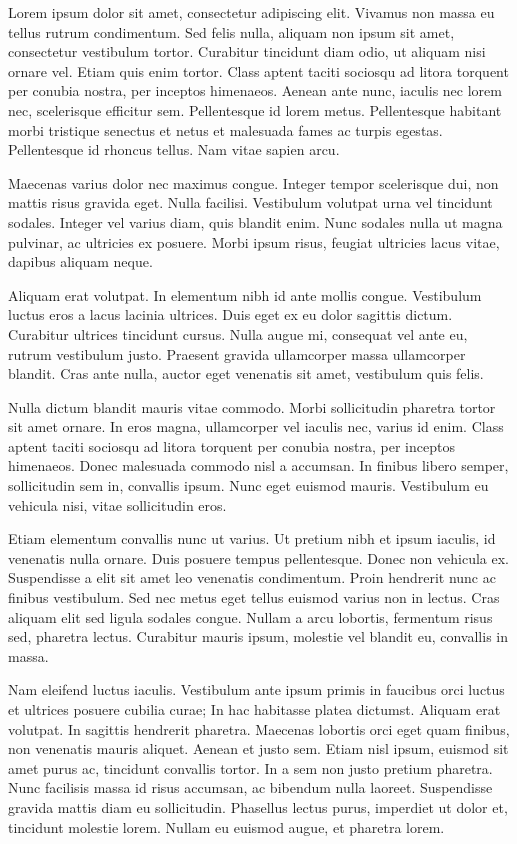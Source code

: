 \documentclass{article}
\begin{document}
Lorem ipsum dolor sit amet, consectetur adipiscing elit. Vivamus non massa eu tellus rutrum condimentum. Sed felis nulla, aliquam non ipsum sit amet, consectetur vestibulum tortor. Curabitur tincidunt diam odio, ut aliquam nisi ornare vel. Etiam quis enim tortor. Class aptent taciti sociosqu ad litora torquent per conubia nostra, per inceptos himenaeos. Aenean ante nunc, iaculis nec lorem nec, scelerisque efficitur sem. Pellentesque id lorem metus. Pellentesque habitant morbi tristique senectus et netus et malesuada fames ac turpis egestas. Pellentesque id rhoncus tellus. Nam vitae sapien arcu.

Maecenas varius dolor nec maximus congue. Integer tempor scelerisque dui, non mattis risus gravida eget. Nulla facilisi. Vestibulum volutpat urna vel tincidunt sodales. Integer vel varius diam, quis blandit enim. Nunc sodales nulla ut magna pulvinar, ac ultricies ex posuere. Morbi ipsum risus, feugiat ultricies lacus vitae, dapibus aliquam neque.

Aliquam erat volutpat. In elementum nibh id ante mollis congue. Vestibulum luctus eros a lacus lacinia ultrices. Duis eget ex eu dolor sagittis dictum. Curabitur ultrices tincidunt cursus. Nulla augue mi, consequat vel ante eu, rutrum vestibulum justo. Praesent gravida ullamcorper massa ullamcorper blandit. Cras ante nulla, auctor eget venenatis sit amet, vestibulum quis felis.

Nulla dictum blandit mauris vitae commodo. Morbi sollicitudin pharetra tortor sit amet ornare. In eros magna, ullamcorper vel iaculis nec, varius id enim. Class aptent taciti sociosqu ad litora torquent per conubia nostra, per inceptos himenaeos. Donec malesuada commodo nisl a accumsan. In finibus libero semper, sollicitudin sem in, convallis ipsum. Nunc eget euismod mauris. Vestibulum eu vehicula nisi, vitae sollicitudin eros.

Etiam elementum convallis nunc ut varius. Ut pretium nibh et ipsum iaculis, id venenatis nulla ornare. Duis posuere tempus pellentesque. Donec non vehicula ex. Suspendisse a elit sit amet leo venenatis condimentum. Proin hendrerit nunc ac finibus vestibulum. Sed nec metus eget tellus euismod varius non in lectus. Cras aliquam elit sed ligula sodales congue. Nullam a arcu lobortis, fermentum risus sed, pharetra lectus. Curabitur mauris ipsum, molestie vel blandit eu, convallis in massa.

Nam eleifend luctus iaculis. Vestibulum ante ipsum primis in faucibus orci luctus et ultrices posuere cubilia curae; In hac habitasse platea dictumst. Aliquam erat volutpat. In sagittis hendrerit pharetra. Maecenas lobortis orci eget quam finibus, non venenatis mauris aliquet. Aenean et justo sem. Etiam nisl ipsum, euismod sit amet purus ac, tincidunt convallis tortor. In a sem non justo pretium pharetra. Nunc facilisis massa id risus accumsan, ac bibendum nulla laoreet. Suspendisse gravida mattis diam eu sollicitudin. Phasellus lectus purus, imperdiet ut dolor et, tincidunt molestie lorem. Nullam eu euismod augue, et pharetra lorem.
\end{document}
